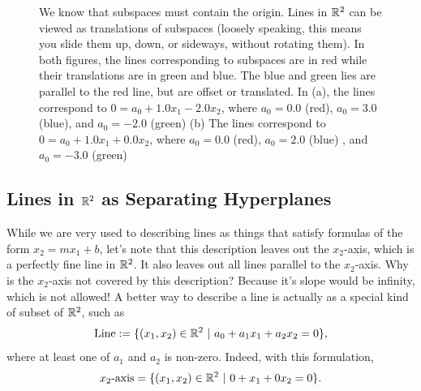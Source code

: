 \begin{figure}[htb!]
    \centering
    \caption[]{We know that subspaces must contain the origin. Lines in $\mathbb R^2$ can be viewed as translations of subspaces (loosely speaking, this means you slide them up, down, or sideways, without rotating them). In both figures, the lines corresponding to subspaces are in red while their translations are in green and blue. The blue and green lies are parallel to the red line, but are offset or translated. In (a),  the lines correspond to $0=a_0 + 1.0 x_1 -2.0 x_2$, where $a_0=0.0$ (red), $a_0=3.0$ (blue), and $a_0=-2.0$ (green) (b) The lines correspond to $0=a_0 + 1.0 x_1 + 0.0 x_2$, where $a_0=0.0$ (red), $a_0=2.0$ (blue) , and $a_0=-3.0$ (green)}
    \label{fig:MoreLinesR2}
    \end{figure}

\subsection{Lines in $\mathbb R^2$ as Separating Hyperplanes}
\label{sec:LineAsHyperplanes}

While we are very used to describing lines as things that satisfy formulas of the form $x_2 = mx_1+b$, let's note that this description leaves out the $x_2$-axis, which is a perfectly fine line in $\mathbb R^2$. It also leaves out all lines parallel to the $x_2$-axis. Why is the $x_2$-axis not covered by this description? Because it's slope would be infinity, which is not allowed! A better way to describe a line is actually as a special kind of subset of $\mathbb R^2$, such as 
$$ {\rm Line}:=\{ (x_1,x_2) \in \mathbb R^2~|~a_0 + a_1 x_1 + a_2 x_2  = 0 \}, $$
where at least one of $a_1$ and $a_2$ is non-zero. Indeed, with this formulation,
$$x_2\text{-axis} = \{ (x_1,x_2) \in \mathbb R^2~|~0 + x_1 + 0 x_2= 0 \}.  $$

